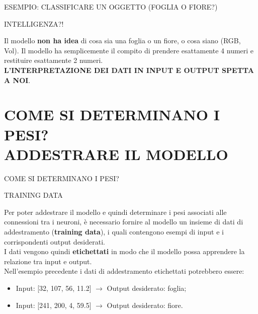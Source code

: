 \documentclass[aspectratio=1610]{beamer}
\begin{document}
\begin{frame}{ESEMPIO: CLASSIFICARE UN OGGETTO (FOGLIA O FIORE?)}
    \begin{alertblock}{INTELLIGENZA?!}
        \begin{minipage}{0.98\linewidth}
            \justifying
            Il modello \textbf{non ha idea} di cosa sia una foglia o un fiore, 
            o cosa siano (RGB, Vol). Il modello ha semplicemente il compito di prendere esattamente 4 
            numeri e restituire esattamente 2 numeri.\\
            \bigskip
            \textbf{L'INTERPRETAZIONE DEI DATI IN INPUT E OUTPUT SPETTA A NOI}.
        \end{minipage}
    \end{alertblock}
\end{frame}

\section{COME SI DETERMINANO I PESI? \\ ADDESTRARE IL MODELLO}

\begin{frame}{COME SI DETERMINANO I PESI?}
    \begin{alertblock}{TRAINING DATA}
        \begin{minipage}{0.98\linewidth}
            \justifying
            Per poter addestrare il modello e quindi determinare i pesi associati alle connessioni tra i neuroni, 
            è necessario fornire al modello un insieme di dati di addestramento (\textbf{training data}), i quali 
            contengono esempi di input e i corrispondenti output desiderati.\\
            I dati vengono quindi \textbf{etichettati} in modo che il modello possa apprendere la relazione 
            tra input e output.\\
            Nell'esempio precedente i dati di addestramento etichettati potrebbero essere: 
            \begin{itemize}
                \item Input: [32, 107, 56, 11.2] $\rightarrow$ Output desiderato: foglia;
                \item Input: [241, 200, 4, 59.5] $\rightarrow$ Output desiderato: fiore.
            \end{itemize}
        \end{minipage}
    \end{alertblock}
\end{frame}
\end{document}
